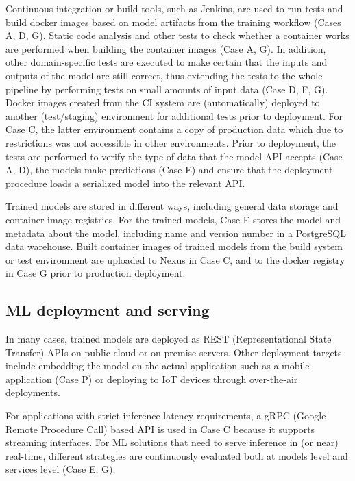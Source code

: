 Continuous integration or build tools, such as Jenkins, are used to run tests and build docker images based on model artifacts from the training workflow (Cases A, D, G). Static code analysis and other tests to check whether a container works are performed when building the container images (Case A, G). In addition, other domain-specific tests are executed to make certain that the inputs and outputs of the model are still correct, thus extending the tests to the whole pipeline by performing tests on small amounts of input data (Case D, F, G). Docker images created from the CI system are (automatically) deployed to another (test/staging) environment for additional tests prior to deployment. %
For Case C, the latter environment contains a copy of production data which due to restrictions was not accessible in other environments. Prior to deployment, the tests are performed to verify the type of data that the model API accepts (Case A, D), the models make predictions (Case E) and ensure that the deployment procedure loads a serialized model into the relevant API.

Trained models are stored in different ways, including general data storage and container image registries. For the trained models, Case E stores the model and metadata about the model, including name and version number in a PostgreSQL data warehouse. Built container images of trained models from the build system or test environment are uploaded to Nexus in Case C, and to the docker registry in Case G prior to production deployment. 



\subsection{ML deployment and serving}
In many cases, trained models are deployed as REST (Representational State Transfer) APIs on public cloud or on-premise servers. Other deployment targets include embedding the model on the actual application  such as a mobile application (Case P) or deploying to IoT devices through over-the-air deployments.

For applications with strict inference latency requirements, a gRPC (Google Remote Procedure Call) based API is used in Case C because it supports streaming interfaces. For ML solutions that need to serve inference in (or near) real-time, different strategies are continuously evaluated both at models level and services level (Case E, G). 

